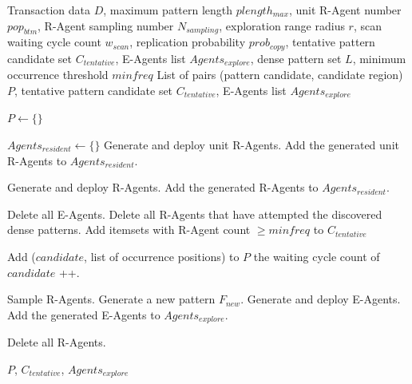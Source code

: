 \begin{algorithm}[t] 

    \makeatletter 
    \renewcommand{\algorithmicrequire}{\textbf{Input:}} 
    \renewcommand{\algorithmicensure}{\textbf{Output:}} 
    \makeatother
    
    \begin{algorithmic}[1]
    \caption{Candidate Extraction Module} 
    \label{alg:candidate-extraction-module}
        \Require Transaction data $D$, maximum pattern length $plength_{max}$, unit R-Agent number $pop_{btm}$, R-Agent sampling number $N_{sampling}$, exploration range radius $r$, scan waiting cycle count $w_{scan}$, replication probability $prob_{copy}$, tentative pattern candidate set $C_{tentative}$, E-Agents list $Agents_{explore}$, dense pattern set $L$, minimum occurrence threshold $minfreq$
        \Ensure List of pairs (pattern candidate, candidate region) $P$, tentative pattern candidate set $C_{tentative}$, E-Agents list $Agents_{explore}$
        
        \State $P \gets \{\}$ 

        \State $Agents_{resident} \gets \{\}$
        \State Generate and deploy unit R-Agents.
        \State Add the generated unit R-Agents to $Agents_{resident}$.
        
            \State Generate and deploy R-Agents.
            \State Add the generated R-Agents to $Agents_{resident}$.
        \EndFor
        
        \State Delete all E-Agents.
        \State Delete all R-Agents that have attempted the discovered dense patterns.
        \State Add itemsets with R-Agent count $\geq minfreq$ to $C_{tentative}$ 
        
                \State Add ($candidate$, list of occurrence positions) to $P$ 
            \Else
                \State the waiting cycle count of $candidate$ ++.
            \EndIf
        \EndFor
        
        \State Sample R-Agents.
            \State Generate a new pattern $F_{new}$.
            \State Generate and deploy E-Agents.
            \State Add the generated E-Agents to $Agents_{explore}$.
        \EndFor
        
        \State Delete all R-Agents.
        
        \State \Return $P$, $C_{tentative}$, $Agents_{explore}$
    \end{algorithmic}
\end{algorithm}

